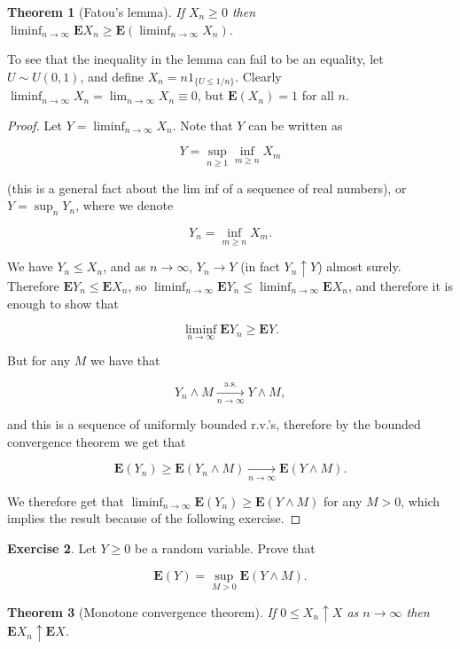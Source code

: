 \documentclass[11pt]{report}
\theoremstyle{plain}
\newtheorem{thm}{Theorem}[chapter]
\theoremstyle{definition}
\newtheorem{xexercise}[thm]{Exercise}
\begin{document}
\begin{thm}[Fatou's lemma]
If $X_n \ge 0$ then
$\liminf_{n\to\infty} \mathbf{E} X_n \ge
\mathbf{E}(\liminf_{n\to\infty} X_n).$
\end{thm}

To see that the inequality in the lemma can fail to
be an equality, let $U \sim U(0,1)$, and define
$X_n = n 1_{\{U\le 1/n\}}$. Clearly
$\liminf_{n\to\infty}X_n=\lim_{n\to\infty} X_n \equiv
0$,
but $\mathbf{E}(X_n) = 1$ for all $n$.

\begin{proof}
Let $Y = \liminf_{n\to\infty} X_n$. Note that $Y$ can
be written as

\[
Y = \sup_{n\ge 1} \inf_{m\ge n} X_m
\]

(this is a general fact about the lim inf of a
sequence of real numbers), or $Y = \sup_n Y_n$, where
we denote

\[
Y_n = \inf_{m\ge n} X_m.
\]

We have $Y_n \le X_n$, and as $n\to\infty$,
$Y_n \to Y$ (in fact $Y_n \uparrow Y$) almost surely.
Therefore $\mathbf{E} Y_n \le \mathbf{E} X_n$, so
$\liminf_{n\to\infty} \mathbf{E} Y_n \le
\liminf_{n\to\infty} \mathbf{E} X_n$,
and therefore it is enough to show that

\[
\liminf_{n\to\infty} \mathbf{E} Y_n \ge \mathbf{E} Y.
\]

But for any $M$ we have that

\[
Y_n \wedge M \xrightarrow[n\to\infty]{\textrm{a.s.}} Y \wedge M,
\]

and this is a sequence of uniformly bounded r.v.'s,
therefore by the bounded convergence theorem we get
that

\[
\mathbf{E}(Y_n) \ge \mathbf{E}(Y_n \wedge M) \xrightarrow[n\to\infty]{} \mathbf{E}(Y\wedge M).
\]

We therefore get that
$\liminf_{n\to\infty} \mathbf{E}(Y_n)\ge
\mathbf{E}(Y\wedge M)$
for any $M>0$, which implies the result because of
the following exercise.
\end{proof}

\begin{xexercise}
Let $Y\ge 0$ be a random variable. Prove that

\[
\mathbf{E}(Y) = \sup_{M>0} \mathbf{E}(Y\wedge M).
\]

\end{xexercise}

\begin{thm}[Monotone convergence theorem]
If $0\le X_n \uparrow X$ as $n\to\infty$ then
$\mathbf{E} X_n \uparrow \mathbf{E} X$.
\end{thm}
\end{document}
